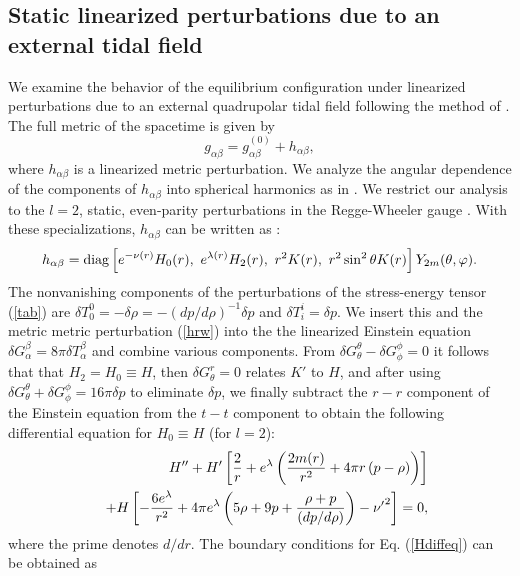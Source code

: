 \documentclass[12pt,preprint]{aastex}
\begin{document}
{\subsection{Static linearized perturbations due to an external
tidal field } \label{subsecpert} We examine the behavior of the
equilibrium configuration under linearized perturbations due to an
external quadrupolar tidal field following the method of \citet{tc}.
The full metric of the spacetime is given by \begin{equation}
g_{\alpha\beta}=g^{(0)}_{\alpha \beta} +h_{\alpha
\beta},\label{gtotal}\end{equation} where $h_{\alpha\beta}$ is a
linearized metric perturbation. We analyze the angular dependence of
the components of $h_{\alpha\beta}$ into spherical harmonics as in
\citet{rw}. We restrict our analysis to the $l=2$, static,
even-parity perturbations in the Regge-Wheeler gauge \citep{rw}.
With these specializations, $h_{\alpha\beta}$ can be written as
\citep{rw, tc}:
\begin{equation} h_{\alpha \beta} ={\rm diag}
\left[e^{-\nu(r)}H_0(r), ~ e^{\lambda(r)} H_2(r), ~ r^2 K(r), ~
r^2 \sin^2\theta K(r)\right] Y_{2m}(\theta, \varphi)\label{hrw}.
\end{equation}
The nonvanishing components of the perturbations of the
stress-energy tensor (\ref{tab}) are $\delta T^0_0=-\delta
\rho=-(dp/d\rho)^{-1}\delta p$ and $\delta T^i_i=\delta p$. We
insert this and the metric metric perturbation (\ref{hrw}) into the
the linearized Einstein equation $\delta G_{\alpha}^{\beta} = 8 \pi
\delta T_{\alpha}^{\beta}$ and combine various components. From
$\delta G^\theta_\theta-\delta G^\phi_\phi=0$ it follows that that
$H_2=H_0\equiv H$, then $\delta G^r_\theta=0$ relates $K'$ to $H$,
and after using $\delta G_\theta ^\theta+\delta G_\phi^\phi=16\pi
\delta p$ to eliminate $\delta p$, we finally subtract the $r-r$
component of the Einstein equation from the $t-t$ component to
obtain the following differential equation for $H_0\equiv H$ (for
$l= 2$):
\begin{eqnarray}
&&H{''}+H{'} \left[{2 \over r} + e^{\lambda} \left( {2m(r)\over
r^2}
+ 4 \pi r \left(p-\rho\right)\right) \right]\nonumber\\
&&+H\left[ -{6 e^{\lambda} \over r^2 } + 4 \pi e^{\lambda}\left( 5
\rho + 9 p +
 {\rho + p \over \left(dp/d\rho\right)} \right)
 - \nu{'}^2 \right]=0,
\label{Hdiffeq}\end{eqnarray} where the prime denotes $d/dr$. The
boundary conditions for Eq. (\ref{Hdiffeq}) can be obtained as
}
\end{document}
